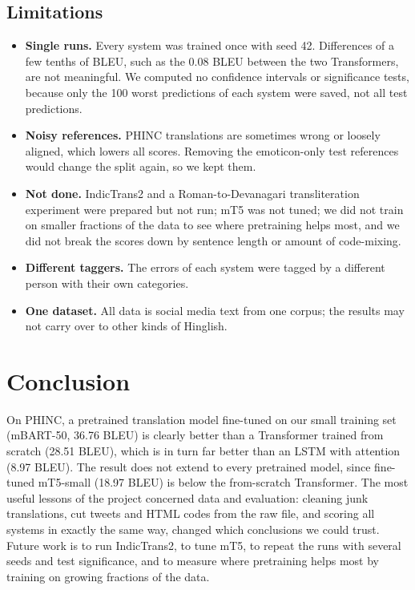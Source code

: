\documentclass[11pt,a4paper]{article}
\begin{document}
\subsection{Limitations}
\begin{itemize}\setlength\itemsep{0pt}
\item \textbf{Single runs.} Every system was trained once with seed 42. Differences of a few tenths of BLEU, such as the 0.08 BLEU between the two Transformers, are not meaningful. We computed no confidence intervals or significance tests, because only the 100 worst predictions of each system were saved, not all test predictions.
\item \textbf{Noisy references.} PHINC translations are sometimes wrong or loosely aligned, which lowers all scores. Removing the emoticon-only test references would change the split again, so we kept them.
\item \textbf{Not done.} IndicTrans2 and a Roman-to-Devanagari transliteration experiment were prepared but not run; mT5 was not tuned; we did not train on smaller fractions of the data to see where pretraining helps most, and we did not break the scores down by sentence length or amount of code-mixing.
\item \textbf{Different taggers.} The errors of each system were tagged by a different person with their own categories.
\item \textbf{One dataset.} All data is social media text from one corpus; the results may not carry over to other kinds of Hinglish.
\end{itemize}
\section{Conclusion}
On PHINC, a pretrained translation model fine-tuned on our small training set (mBART-50, 36.76 BLEU) is clearly better than a Transformer trained from scratch (28.51 BLEU), which is in turn far better than an LSTM with attention (8.97 BLEU). The result does not extend to every pretrained model, since fine-tuned mT5-small (18.97 BLEU) is below the from-scratch Transformer. The most useful lessons of the project concerned data and evaluation: cleaning junk translations, cut tweets and HTML codes from the raw file, and scoring all systems in exactly the same way, changed which conclusions we could trust. Future work is to run IndicTrans2, to tune mT5, to repeat the runs with several seeds and test significance, and to measure where pretraining helps most by training on growing fractions of the data.
\end{document}
